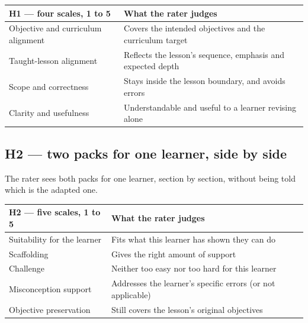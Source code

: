 \documentclass[11pt,a4paper]{article}
\begin{document}
\begin{center}
\begin{tabular}{@{}p{52mm}p{78mm}@{}}
\toprule
\textbf{H1 --- four scales, 1 to 5} & \textbf{What the rater judges}\\
\midrule
Objective and curriculum alignment & Covers the intended objectives and the curriculum target\\
Taught-lesson alignment & Reflects the lesson's sequence, emphasis and expected depth\\
Scope and correctness & Stays inside the lesson boundary, and avoids errors\\
Clarity and usefulness & Understandable and useful to a learner revising alone\\
\bottomrule
\end{tabular}
\end{center}

\subsection{H2 --- two packs for one learner, side by side}

The rater sees both packs for one learner, section by section, without being told which is
the adapted one.

\begin{center}
\begin{tabular}{@{}p{52mm}p{78mm}@{}}
\toprule
\textbf{H2 --- five scales, 1 to 5} & \textbf{What the rater judges}\\
\midrule
Suitability for the learner & Fits what this learner has shown they can do\\
Scaffolding & Gives the right amount of support\\
Challenge & Neither too easy nor too hard for this learner\\
Misconception support & Addresses the learner's specific errors (or not applicable)\\
Objective preservation & Still covers the lesson's original objectives\\
\bottomrule
\end{tabular}
\end{center}
\end{document}
